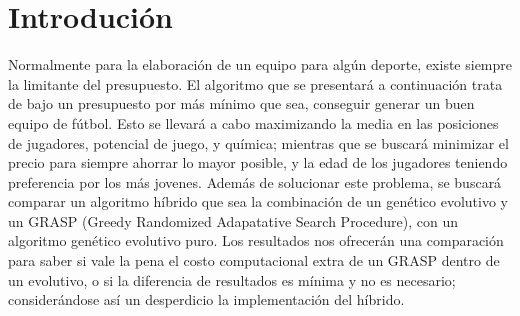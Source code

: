 \documentclass[11pt, twocolumn]{article}
\begin{document}

\section{Introdución}

Normalmente para la elaboración de un equipo para algún deporte, existe siempre la limitante del presupuesto. El algoritmo que se presentará a continuación trata de bajo un presupuesto por más mínimo que sea, conseguir generar un buen equipo de fútbol. Esto se llevará a cabo maximizando la media en las posiciones de jugadores, potencial de juego, y química; mientras que se buscará minimizar el precio para siempre ahorrar lo mayor posible, y la edad de los jugadores teniendo preferencia por los más jovenes.\newline
Además de solucionar este problema, se buscará comparar un algoritmo híbrido que sea la combinación de un genético evolutivo y un GRASP (Greedy Randomized Adapatative Search Procedure), con un algoritmo genético evolutivo puro.\newline
Los resultados nos ofrecerán una comparación para saber si vale la pena el costo computacional extra de un GRASP dentro de un evolutivo, o si la diferencia de resultados es mínima y no es necesario; considerándose así un desperdicio la implementación del híbrido.\newline
\end{document}
